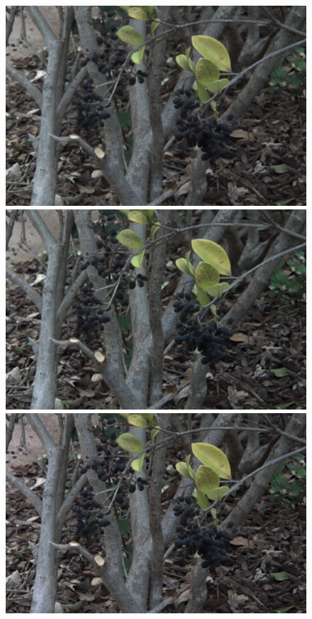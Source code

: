 \documentclass[10pt,twocolumn,letterpaper]{article}
\begin{document}
\begin{figure}[h]
    \begin{multicols}{3}
        \includegraphics[width=\linewidth]{flowers_25/kalantari_05_05.png}
        \includegraphics[width=\linewidth]{flowers_25/ours_05_05.png}
        \includegraphics[width=\linewidth]{flowers_25/truth_05_05.png}

\end{multicols}
\end{figure}
\end{document}
